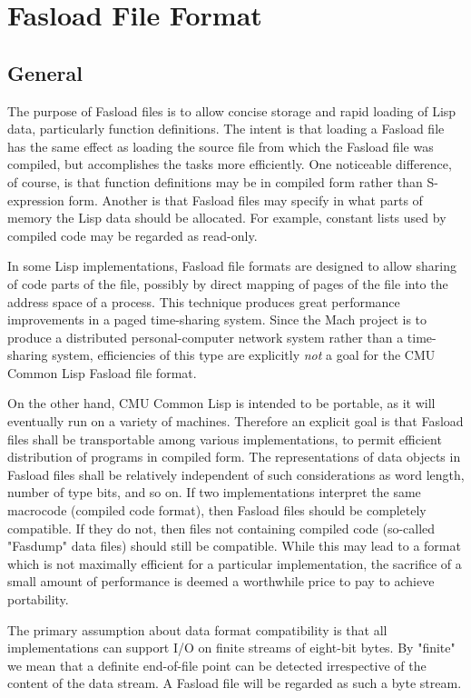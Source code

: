 \chapter{Fasload File Format}%
\section{General}

The purpose of Fasload files is to allow concise storage and rapid
loading of Lisp data, particularly function definitions.  The intent
is that loading a Fasload file has the same effect as loading the
source file from which the Fasload file was compiled, but accomplishes
the tasks more efficiently.  One noticeable difference, of course, is
that function definitions may be in compiled form rather than
S-expression form.  Another is that Fasload files may specify in what
parts of memory the Lisp data should be allocated.  For example,
constant lists used by compiled code may be regarded as read-only.

In some Lisp implementations, Fasload file formats are designed to
allow sharing of code parts of the file, possibly by direct mapping
of pages of the file into the address space of a process.  This
technique produces great performance improvements in a paged
time-sharing system.  Since the Mach project is to produce a
distributed personal-computer network system rather than a
time-sharing system, efficiencies of this type are explicitly {\it not}
a goal for the CMU Common Lisp Fasload file format.

On the other hand, CMU Common Lisp is intended to be portable, as it will
eventually run on a variety of machines.  Therefore an explicit goal
is that Fasload files shall be transportable among various
implementations, to permit efficient distribution of programs in
compiled form.  The representations of data objects in Fasload files
shall be relatively independent of such considerations as word
length, number of type bits, and so on.  If two implementations
interpret the same macrocode (compiled code format), then Fasload
files should be completely compatible.  If they do not, then files
not containing compiled code (so-called "Fasdump" data files) should
still be compatible.  While this may lead to a format which is not
maximally efficient for a particular implementation, the sacrifice of
a small amount of performance is deemed a worthwhile price to pay to
achieve portability.

The primary assumption about data format compatibility is that all
implementations can support I/O on finite streams of eight-bit bytes.
By "finite" we mean that a definite end-of-file point can be detected
irrespective of the content of the data stream.  A Fasload file will
be regarded as such a byte stream.

